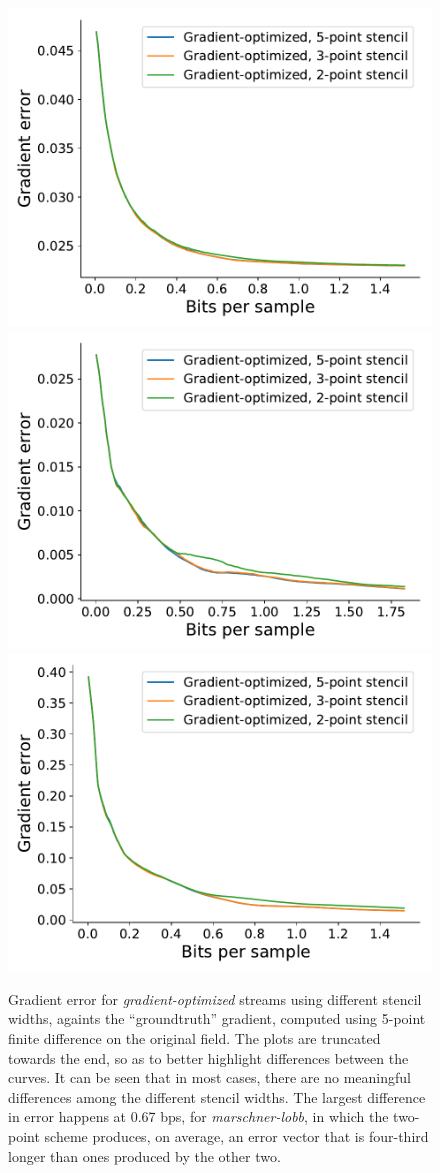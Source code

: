 \begin{figure}
	{\includegraphics[width=0.48\linewidth]{img/gradient/compare-stencils/gradient-optimized-pressure.pdf}}
	{\includegraphics[width=0.48\linewidth]{img/gradient/compare-stencils/gradient-optimized-marschner-lobb.pdf}}
	{\includegraphics[width=0.48\linewidth]{img/gradient/compare-stencils/gradient-optimized-velocityz.pdf}}
	\caption{Gradient error for \emph{gradient-optimized} streams using different stencil widths,
	againts the ``groundtruth'' gradient, computed using 5-point finite difference on the original
	field. The plots are truncated towards the end, so as to better highlight differences between the
	curves. It can be seen that in most cases, there are no meaningful differences among the different
	stencil widths. The largest difference in error happens at 0.67 bps, for \emph{marschner-lobb}, in
	which the two-point scheme produces, on average, an error vector that is four-third longer than
	ones produced by the other two.}
	\label{fig:gradient-stencil-comparison}
\end{figure}

